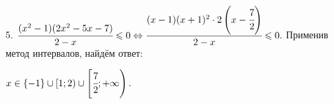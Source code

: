 5. $\cfrac{(x^2-1)(2x^2-5x-7)}{2-x}\leqslant0\Leftrightarrow\cfrac{(x-1)(x+1)^2\cdot 2\left(x-\cfrac{7}{2}\right)}{2-x}\leqslant0.$ Применив метод интервалов, найдём ответ:
\begin{figure}[ht!]
\end{figure}
$x\in\{-1\}\cup[1;2)\cup\left[\cfrac{7}{2};+\infty\right).$\\
